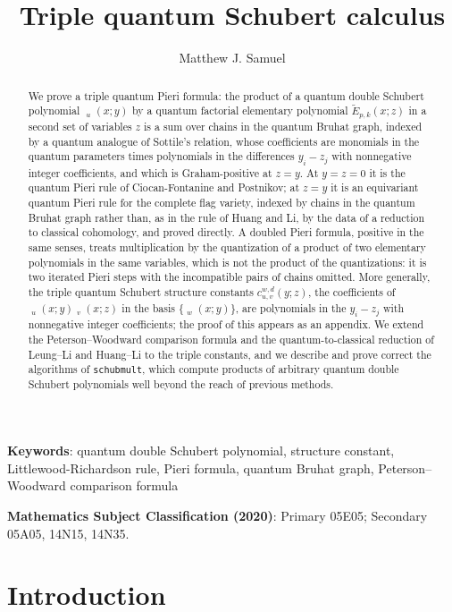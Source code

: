 \documentclass{amsart}
\title{Triple quantum Schubert calculus}
\author{Matthew J. Samuel}
\theoremstyle{definition}
\theoremstyle{remark}
\numberwithin{equation}{section}
\DeclareMathOperator{\qsch}{\widetilde{\mathfrak{S}}}
\newcommand{\qelem}{\widetilde{E}}
\begin{document}
\begin{abstract}
We prove a triple quantum Pieri formula: the product of a quantum double Schubert polynomial $\qsch_u(x;y)$ by a quantum factorial elementary polynomial $\qelem_{p,k}(x;z)$ in a second set of variables $z$ is a sum over chains in the quantum Bruhat graph, indexed by a quantum analogue of Sottile's relation, whose coefficients are monomials in the quantum parameters times polynomials in the differences $y_i-z_j$ with nonnegative integer coefficients, and which is Graham-positive at $z=y$. At $y=z=0$ it is the quantum Pieri rule of Ciocan-Fontanine and Postnikov; at $z=y$ it is an equivariant quantum Pieri rule for the complete flag variety, indexed by chains in the quantum Bruhat graph rather than, as in the rule of Huang and Li, by the data of a reduction to classical cohomology, and proved directly. A doubled Pieri formula, positive in the same senses, treats multiplication by the quantization of a product of two elementary polynomials in the same variables, which is not the product of the quantizations: it is two iterated Pieri steps with the incompatible pairs of chains omitted. More generally, the triple quantum Schubert structure constants $c_{u,v}^{w,d}(y;z)$, the coefficients of $\qsch_u(x;y)\qsch_v(x;z)$ in the basis $\{\qsch_w(x;y)\}$, are polynomials in the $y_i-z_j$ with nonnegative integer coefficients; the proof of this appears as an appendix. We extend the Peterson--Woodward comparison formula and the quantum-to-classical reduction of Leung--Li and Huang--Li to the triple constants, and we describe and prove correct the algorithms of \texttt{schubmult}, which compute products of arbitrary quantum double Schubert polynomials well beyond the reach of previous methods.
\end{abstract}
\maketitle

{\bf Keywords}: quantum double Schubert polynomial, structure constant, Littlewood-Richardson rule, Pieri formula, quantum Bruhat graph, Peterson--Woodward comparison formula

{\bf Mathematics Subject Classification (2020)}: Primary 05E05; Secondary 05A05, 14N15, 14N35.

\section{Introduction}
\end{document}
